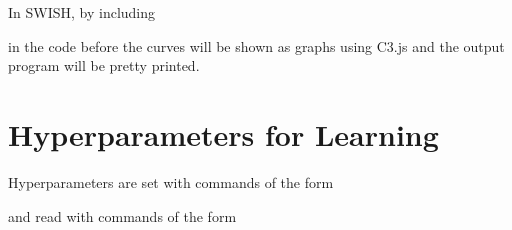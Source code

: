 \documentclass[letterpaper,10pt,english]{sphinxmanual}
\begin{document}
\sphinxAtStartPar
In SWISH, by including

\begin{sphinxVerbatim}[commandchars=\\\{\}]
 
 
\end{sphinxVerbatim}

\sphinxAtStartPar
in the code before  the curves will be shown as graphs using C3.js and the output program will be pretty printed.


\section{Hyper\sphinxhyphen{}parameters for Learning}
\label{\detokenize{index:hyper-parameters-for-learning}}
\sphinxAtStartPar
Hyper\sphinxhyphen{}parameters are set with commands of the form

\begin{sphinxVerbatim}[commandchars=\\\{\}]
 
\end{sphinxVerbatim}

\sphinxAtStartPar
and read with commands of the form
\end{document}
